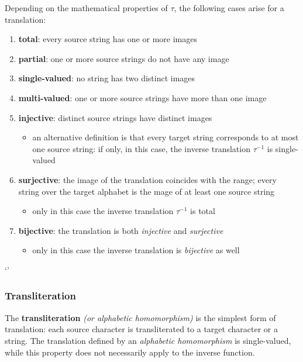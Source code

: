 \documentclass[english]{article}
\begin{document}
\bigskip
Depending on the mathematical properties of \(\tau\), the following cases arise for a translation:

\begin{enumerate}
  \item \textbf{total}: every source string has one or more images
  \item \textbf{partial}: one or more source strings do not have any image
  \item \textbf{single-valued}: no string has two distinct images
  \item \textbf{multi-valued}: one or more source strings have more than one image
  \item \textbf{injective}: distinct source strings have distinct images
        \begin{itemize}[label=\(\rightarrow\)]
          \item an alternative definition is that every target string corresponds to at most one source string: if only, in this case, the inverse translation \(\tau^{-1}\) is single-valued
        \end{itemize}
  \item \textbf{surjective}: the image of the translation coincides with the range; every string over the target alphabet is the mage of at least one source string
        \begin{itemize}[label=\(\rightarrow\)]
          \item only in this case the inverse translation \(\tau^{-1}\) is total
        \end{itemize}
  \item \textbf{bijective}: the translation is both \textit{injective} and \textit{surjective}
        \begin{itemize}[label=\(\rightarrow\)]
          \item only in this case the inverse translation is \textit{bijective} as well
        \end{itemize}
\end{enumerate}`'

\subsubsection{Transliteration}

The \textbf{transliteration} \textit{(or alphabetic homomorphism)} is the simplest form of translation:
each source character is transliterated to a target character or a string.
The translation defined by an \textit{alphabetic homomorphism} is single-valued, while this property does not necessarily apply to the inverse function.
\end{document}
